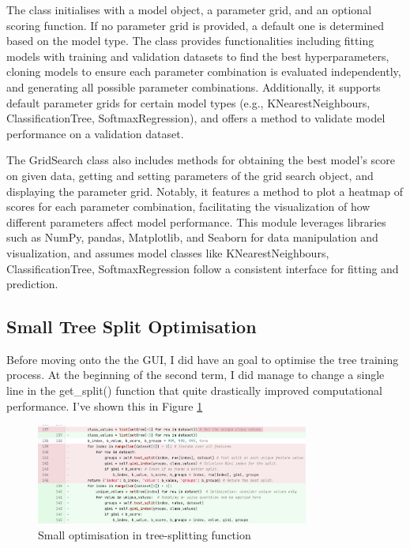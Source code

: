 \documentclass[letterpaper,10pt]{article}
\begin{document}
The class initialises with a model object, a parameter grid, and an optional scoring function. If no parameter grid is provided, a default one is determined based on the model type. The class provides functionalities including fitting models with training and validation datasets to find the best hyperparameters, cloning models to ensure each parameter combination is evaluated independently, and generating all possible parameter combinations. Additionally, it supports default parameter grids for certain model types (e.g., KNearestNeighbours, ClassificationTree, SoftmaxRegression), and offers a method to validate model performance on a validation dataset.

The GridSearch class also includes methods for obtaining the best model's score on given data, getting and setting parameters of the grid search object, and displaying the parameter grid. Notably, it features a method to plot a heatmap of scores for each parameter combination, facilitating the visualization of how different parameters affect model performance. This module leverages libraries such as NumPy, pandas, Matplotlib, and Seaborn for data manipulation and visualization, and assumes model classes like KNearestNeighbours, ClassificationTree, SoftmaxRegression follow a consistent interface for fitting and prediction.

\subsection{Small Tree Split Optimisation}
Before moving onto the the GUI, I did have an goal to optimise the tree training process. At the beginning of the second term, I did manage to change a single line in the get\_split() function that quite drastically improved computational performance. I've shown this in Figure \ref{tree_optimisation}\par

\begin{figure}[ht]
    \centering
    \includegraphics[width=0.8\textwidth]{tree_optimisation.png}
    \caption{Small optimisation in tree-splitting function}
    \label{tree_optimisation}
\end{figure}
\end{document}
